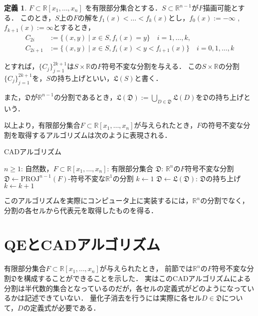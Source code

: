 \documentclass[uplatex, dvipdfmx]{jsarticle}
\newcommand{\R}{\mathbb{R}}
\newcommand{\PROJ}{\mathrm{PROJ}}
\theoremstyle{definition}
\newtheorem{definition}{定義}[section]
\begin{document}
\begin{definition}
$ F \subset \mathbb{R}[x_1,\dots,x_n] $ を有限部分集合とする．$ S \subset \mathbb{R}^{n-1} $が$ F $描画可能とする．
このとき，$ S $上の$ F $の解を$ f_1(x)< \dots <f_k(x) $とし，$ f_0(x) := -\infty $ , $ f_{k+1}(x) := \infty $とするとき，
\begin{align*}
  C_{2i} &:= \{(x,y) \mid  x \in S, f_i(x) = y \} \quad i = 1,\dots, k,\\
  C_{2i+1} &:= \{(x,y) \mid x \in S, f_{i}(x)<y<f_{i+1}(x) \} \quad i = 0,1, \dots, k 
\end{align*}

とすれば，$\{C_j\}_{j=1}^{2k+1}$は$ S \times \mathbb{R} $の$F$符号不変な分割を与える．
この$ S \times \mathbb{R} $の分割$ \{C_j\}_{j=1}^{2k+1} $を，$ S $の持ち上げといい，$ \mathfrak{L}(S) $と書く．

また，$\mathfrak{D}$が$\R^{n-1}$の分割であるとき，$\mathfrak{L}(\mathfrak{D}) := \bigcup_{D \in \mathfrak{D}}\mathfrak{L}(D)$を$\mathfrak{D}$の持ち上げという．
\end{definition}

以上より，有限部分集合$F \subset \R[x_1, \dots, x_n]$が与えられたとき，$F$の符号不変な分割を取得するアルゴリズムは次のように表現される．

\begin{algorithm}
    \caption{CADアルゴリズム}
    \begin{algorithmic}[1]
    \REQUIRE $n \geq 1$: 自然数，$F \subset \R[x_1, \dots, x_n]$: 有限部分集合
    \ENSURE $\mathfrak{D}$: $\R^n$の$F$符号不変な分割
    \STATE $\mathfrak{D} \leftarrow \text{$\PROJ^{n-1}(F)$-符号不変な$\R^1$の分割}$
    \STATE $k \leftarrow 1$
    \STATE $\mathfrak{D} \leftarrow \text{$\mathfrak{L}(\mathfrak{D})$: $\mathfrak{D}$の持ち上げ}$
    \STATE $k \leftarrow k+1$
    \ENDWHILE
    \end{algorithmic}
\end{algorithm}

このアルゴリズムを実際にコンピュータ上に実装するには，$\R^n$の分割でなく，分割の各セルから代表元を取得したものを得る．
\section{QEとCADアルゴリズム}
有限部分集合$F \subset \R[x_1, \dots, x_n]$が与えられたとき，
前節では$\R^n$の$F$符号不変な分割$\mathfrak{D}$を構成することができることを示した．
実はこのCADアルゴリズムによる分割は半代数的集合となっているのだが，各セルの定義式がどのようになっているかは記述できていない．
量化子消去を行うには実際に各セル$D \in \mathfrak{D}$について，$D$の定義式が必要である．
\end{document}
